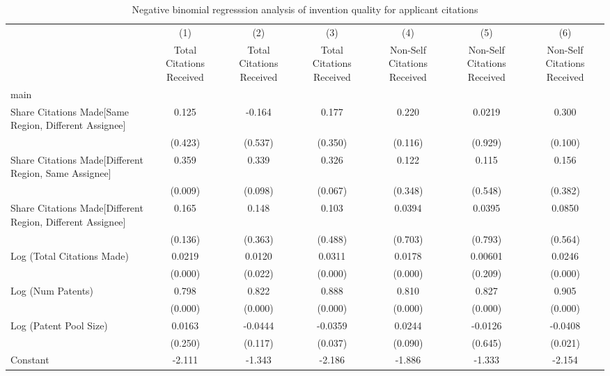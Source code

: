 \begin{table}[htbp]\centering
\caption{Negative binomial regresssion analysis of invention quality for applicant citations  \label{a.model123192021}}
\begin{tabular}{l*{6}{c}}
\hline\hline
                &\multicolumn{1}{c}{(1)}&\multicolumn{1}{c}{(2)}&\multicolumn{1}{c}{(3)}&\multicolumn{1}{c}{(4)}&\multicolumn{1}{c}{(5)}&\multicolumn{1}{c}{(6)}\\
                &\multicolumn{1}{c}{Total Citations Received}&\multicolumn{1}{c}{Total Citations Received}&\multicolumn{1}{c}{Total Citations Received}&\multicolumn{1}{c}{Non-Self Citations Received}&\multicolumn{1}{c}{Non-Self Citations Received}&\multicolumn{1}{c}{Non-Self Citations Received}\\
\hline
main            &         &         &         &         &         &         \\
Share Citations Made[Same Region, Different Assignee]&    0.125&   -0.164&    0.177&    0.220&   0.0219&    0.300\\
                &  (0.423)&  (0.537)&  (0.350)&  (0.116)&  (0.929)&  (0.100)\\
Share Citations Made[Different Region, Same Assignee]&    0.359&    0.339&    0.326&    0.122&    0.115&    0.156\\
                &  (0.009)&  (0.098)&  (0.067)&  (0.348)&  (0.548)&  (0.382)\\
Share Citations Made[Different Region, Different Assignee]&    0.165&    0.148&    0.103&   0.0394&   0.0395&   0.0850\\
                &  (0.136)&  (0.363)&  (0.488)&  (0.703)&  (0.793)&  (0.564)\\
Log (Total Citations Made)&   0.0219&   0.0120&   0.0311&   0.0178&  0.00601&   0.0246\\
                &  (0.000)&  (0.022)&  (0.000)&  (0.000)&  (0.209)&  (0.000)\\
Log (Num Patents)&    0.798&    0.822&    0.888&    0.810&    0.827&    0.905\\
                &  (0.000)&  (0.000)&  (0.000)&  (0.000)&  (0.000)&  (0.000)\\
Log (Patent Pool Size)&   0.0163&  -0.0444&  -0.0359&   0.0244&  -0.0126&  -0.0408\\
                &  (0.250)&  (0.117)&  (0.037)&  (0.090)&  (0.645)&  (0.021)\\
Constant        &   -2.111&   -1.343&   -2.186&   -1.886&   -1.333&   -2.154\\

\end{tabular}
\end{table}
